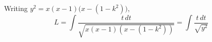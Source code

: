 \documentclass{beamer}
\begin{document}
\begin{frame}
	Writing $y^{2} = x(x-1)\big( x - ( 1 - k^{2} )\big)$,
	\begin{equation*}
		L = \int \frac{t\, dt}{\sqrt{ x(x-1)(x - (1-k^{2}) ) }} = \int \frac{t\, dt}{\sqrt{y^{2}}}
	\end{equation*}
\end{frame}

\begin{frame}
\end{frame}

\begin{frame}
\end{frame}

\begin{frame}
\end{frame}

\begin{frame}
\end{frame}

\begin{frame}
\end{frame}

\begin{frame}
\end{frame}
\end{document}
